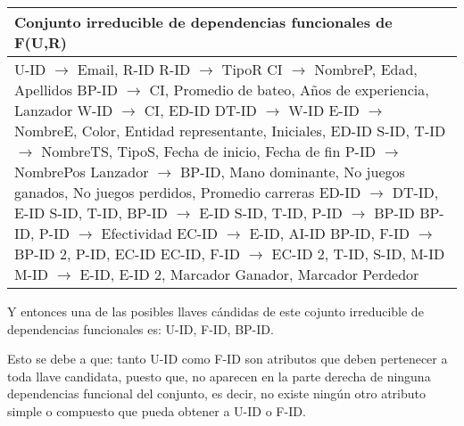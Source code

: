 \documentclass{report}
\begin{document}
    \begin{tabularx}{\textwidth}{|X|}
        \toprule
        \hfil \textbf{Conjunto irreducible de dependencias funcionales de F(U,R)} \\
        \midrule
        U-ID $\rightarrow$ Email, R-ID \newline 
        R-ID $\rightarrow$ TipoR \newline 
        CI $\rightarrow$ NombreP, Edad, Apellidos \newline 
        BP-ID $\rightarrow$ CI, Promedio de bateo, Años de experiencia, Lanzador \newline 
        W-ID $\rightarrow$ CI, ED-ID \newline 
        DT-ID $\rightarrow$ W-ID \newline 
        E-ID $\rightarrow$ NombreE, Color, Entidad representante, Iniciales, ED-ID \newline 
        S-ID, T-ID $\rightarrow$ NombreTS, TipoS, Fecha de inicio, Fecha de fin \newline 
        P-ID $\rightarrow$ NombrePos \newline 
        Lanzador $\rightarrow$ BP-ID, Mano dominante, No juegos ganados, No juegos perdidos, Promedio carreras \newline 
        ED-ID $\rightarrow$ DT-ID, E-ID \newline 
        S-ID, T-ID, BP-ID $\rightarrow$ E-ID \newline 
        S-ID, T-ID, P-ID $\rightarrow$ BP-ID \newline 
        BP-ID, P-ID $\rightarrow$ Efectividad \newline 
        EC-ID $\rightarrow$ E-ID, AI-ID \newline 
        BP-ID, F-ID $\rightarrow$ BP-ID 2, P-ID, EC-ID \newline 
        EC-ID, F-ID $\rightarrow$ EC-ID 2, T-ID, S-ID, M-ID \newline 
        M-ID $\rightarrow$ E-ID, E-ID 2, Marcador Ganador, Marcador Perdedor \\ 
        \bottomrule
    \end{tabularx}

    \newpage 

    Y entonces una de las posibles llaves cándidas de este cojunto irreducible de dependencias funcionales es: U-ID, F-ID, BP-ID. \newline

    Esto se debe a que: tanto U-ID como F-ID son atributos que deben pertenecer a toda llave candidata, puesto que,
    no aparecen en la parte derecha de ninguna dependencias funcional del conjunto, es decir, no existe ningún
    otro atributo simple o compuesto que pueda obtener a U-ID o F-ID. \newline
    
\end{document}
